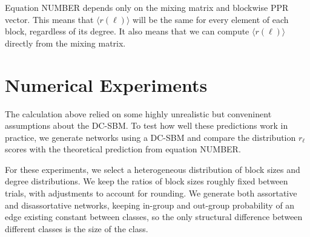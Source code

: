 \documentclass[12pt]{article}
\begin{document}
Equation NUMBER depends only on the mixing matrix and blockwise PPR vector.  This means that $\langle r(\ell) \rangle$ will be the same for every element of each block, regardless of its degree.  It also means that we can compute $\langle r(\ell) \rangle$ directly from the mixing matrix.

\section{Numerical Experiments}
The calculation above relied on some highly unrealistic but conveninent assumptions about the DC-SBM.  To test how well these predictions work in practice, we generate networks using a DC-SBM and compare the distribution $r_\ell$ scores with the theoretical prediction from equation NUMBER.

For these experiments, we select a heterogeneous distribution of block sizes and degree distributions.  We keep the ratios of block sizes roughly fixed between trials, with adjustments to account for rounding.  We generate both assortative and disassortative networks, keeping in-group and out-group probability of an edge existing constant between classes, so the only structural difference between different classes is the size of the class. 
\end{document}
